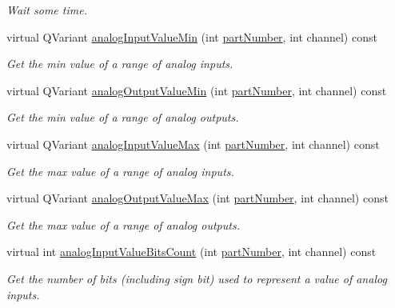 \begin{DoxyCompactItemize}
\begin{DoxyCompactList}\small\item\em Wait some time. \end{DoxyCompactList}\item 
virtual Q\-Variant \hyperlink{classmdt_device_modbus_wago_module_a6b5af2c05f5428d0866a2f5301c07055}{analog\-Input\-Value\-Min} (int \hyperlink{classmdt_device_modbus_wago_module_ab694800ebccf308beb9eeb9a789b0442}{part\-Number}, int channel) const 
\begin{DoxyCompactList}\small\item\em Get the min value of a range of analog inputs. \end{DoxyCompactList}\item 
virtual Q\-Variant \hyperlink{classmdt_device_modbus_wago_module_a306b6b993c58f9c02defda97c3300e21}{analog\-Output\-Value\-Min} (int \hyperlink{classmdt_device_modbus_wago_module_ab694800ebccf308beb9eeb9a789b0442}{part\-Number}, int channel) const 
\begin{DoxyCompactList}\small\item\em Get the min value of a range of analog outputs. \end{DoxyCompactList}\item 
virtual Q\-Variant \hyperlink{classmdt_device_modbus_wago_module_ae4f0670b0657ace4af5bdc7eb80d7f71}{analog\-Input\-Value\-Max} (int \hyperlink{classmdt_device_modbus_wago_module_ab694800ebccf308beb9eeb9a789b0442}{part\-Number}, int channel) const 
\begin{DoxyCompactList}\small\item\em Get the max value of a range of analog inputs. \end{DoxyCompactList}\item 
virtual Q\-Variant \hyperlink{classmdt_device_modbus_wago_module_a736fe244944e4180d4fd9d35d5ad08d0}{analog\-Output\-Value\-Max} (int \hyperlink{classmdt_device_modbus_wago_module_ab694800ebccf308beb9eeb9a789b0442}{part\-Number}, int channel) const 
\begin{DoxyCompactList}\small\item\em Get the max value of a range of analog outputs. \end{DoxyCompactList}\item 
virtual int \hyperlink{classmdt_device_modbus_wago_module_aec715d2707c556ead4690d82ee9c8307}{analog\-Input\-Value\-Bits\-Count} (int \hyperlink{classmdt_device_modbus_wago_module_ab694800ebccf308beb9eeb9a789b0442}{part\-Number}, int channel) const 
\begin{DoxyCompactList}\small\item\em Get the number of bits (including sign bit) used to represent a value of analog inputs. \end{DoxyCompactList}\item 

\end{DoxyCompactItemize}
